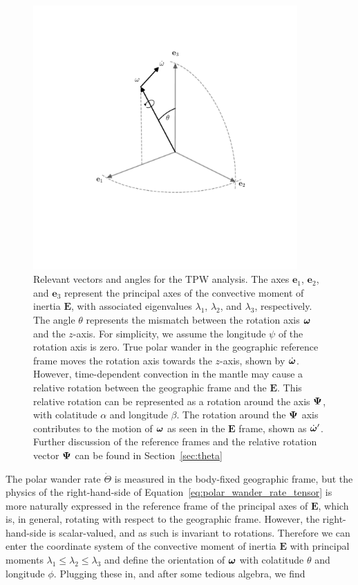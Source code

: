 \documentclass[extra,mreferee]{gji}
\newif\ifdetail
\begin{document}
\begin{figure}
\centering
\includegraphics[width=0.9\textwidth]{figures/reference_frames.pdf}
\caption{Relevant vectors and angles for the TPW analysis. The axes $\mathbf{e}_1$, $\mathbf{e}_2$, and $\mathbf{e}_3$ represent the principal axes of the convective moment of inertia $\mathbf{E}$, with associated eigenvalues $\lambda_1$, $\lambda_2$, and $\lambda_3$, respectively. The angle $\theta$ represents the mismatch between the rotation axis $\mitbf{\omega}$ and the $z$-axis. For simplicity, we assume the longitude $\psi$ of the rotation axis is zero. True polar wander in the geographic reference frame moves the rotation axis towards the $z$-axis, shown by $\dot{\mitbf{\omega}}$. However, time-dependent convection in the mantle may cause a relative rotation between the geographic frame and the $\mathbf{E}$. This relative rotation can be represented as a rotation around the axis $\mitbf{\Psi}$, with colatitude $\alpha$ and longitude $\beta$. The rotation around the $\mitbf{\Psi}$ axis contributes to the motion of $\mitbf{\omega}$ as seen in the $\mathbf{E}$ frame, shown as $\dot{\mitbf{\omega}}^\prime$. Further discussion of the reference frames and the relative rotation vector $\mitbf{\Psi}$ can be found in Section~\ref{sec:theta}}
\label{fig:reference_frames}
\end{figure}

The polar wander rate $\dot{\Theta}$ is measured in the body-fixed geographic frame, 
but the physics of the right-hand-side of Equation~\eqref{eq:polar_wander_rate_tensor} 
is more naturally expressed in the reference frame of the principal axes of $\mathbf{E}$,
which is, in general, rotating with respect to the geographic frame.
However, the right-hand-side is scalar-valued, and as such is invariant to rotations.
Therefore we can enter the coordinate system of the convective moment of inertia $\mathbf{E}$ 
with principal moments $\lambda_1 \le \lambda_2 \le \lambda_3$ and define the orientation of 
$\mitbf{\omega}$ with colatitude $\theta$ and longitude $\phi$.
Plugging these in, and after some tedious algebra, we find
\ifdetail
\end{document}
